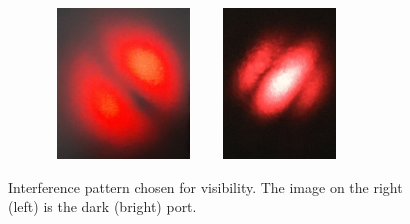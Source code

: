\documentclass[12pt]{book}
\begin{document}
\begin{figure}[H]

\begin{subfigure}[b]{\linewidth}
\centering
\includegraphics[width=4cm,height=4cm]{images/fotos/11.jpg}
\includegraphics[width=4cm,height=4cm]{images/fotos/112.jpg}

\end{subfigure}

\caption{Interference pattern chosen for visibility. The image on the right (left) is the dark (bright) port.}
\label{6.3}
\end{figure}



\pagebreak
\end{document}
